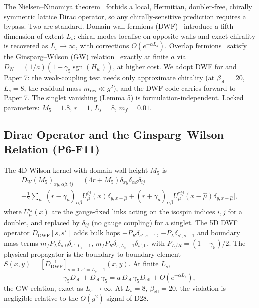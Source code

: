 \documentclass[11pt,a4paper]{article}
\theoremstyle{plain}
\theoremstyle{definition}
\theoremstyle{remark}
\newcommand{\be}{\beta_{\mathrm{eff}}}
\newcommand{\PL}{P_{L}}
\newcommand{\PR}{P_{R}}
\newcommand{\gfive}{\gamma_{5}}
\begin{document}
The Nielsen--Ninomiya theorem~\cite{NN1,NN2} forbids a local, Hermitian,
doubler-free, chirally symmetric lattice Dirac operator, so any
chirally-sensitive prediction requires a bypass. Two are standard. Domain
wall fermions (DWF)~\cite{DWF1,DWF2} introduce a fifth dimension of
extent $L_s$; chiral modes localise on opposite walls and exact chirality
is recovered as $L_s\to\infty$, with corrections $O(e^{-\alpha L_s})$.
Overlap fermions~\cite{NEU} satisfy the Ginsparg--Wilson (GW)
relation~\cite{GW} exactly at finite $a$ via
$D_N=(1/a)(1+\gfive\operatorname{sgn}(H_w))$, at higher cost. We adopt DWF
for  and Paper 7: the weak-coupling test needs only
approximate chirality (at $\be=20$, $L_s=8$, the residual mass
$m_{\mathrm{res}}\ll g^2$), and the DWF code carries forward to Paper 7.
The singlet vanishing (Lemma 5) is formulation-independent. Locked
parameters: $M_5=1.8$, $r=1$, $L_s=8$, $m_f=0.01$.

\subsection{Dirac Operator and the Ginsparg--Wilson Relation (P6-F11)}
\label{ssec:dirac}

The 4D Wilson kernel with domain wall height $M_5$ is
\begin{multline}
  D_W(M_5)_{xy,\alpha\beta,ij}=(4r+M_5)\delta_{xy}\delta_{\alpha\beta}\delta_{ij}\\
  -\tfrac12\sum_\mu\bigl[(r-\gamma_\mu)_{\alpha\beta}U^{ij}_\mu(x)\delta_{y,x+\hat\mu}
  +(r+\gamma_\mu)_{\alpha\beta}U^{\dagger ij}_\mu(x-\hat\mu)\delta_{y,x-\hat\mu}\bigr],
  \label{eq:wilsonkernel}
\end{multline}
where $U^{ij}_\mu(x)$ are the gauge-fixed links acting on the isospin
indices $i,j$ for a doublet, and replaced by $\delta_{ij}$ (no gauge
coupling) for a singlet. The 5D DWF operator
$D_{\mathrm{DWF}}[s,s']$ adds bulk hops $-\PR\delta_{s',s-1}$,
$-\PL\delta_{s',s+1}$ and boundary mass terms
$m_f\PL\delta_{s,0}\delta_{s',L_s-1}$,
$m_f\PR\delta_{s,L_s-1}\delta_{s',0}$, with
$\PL{}_{/R}=(1\mp\gfive)/2$. The physical propagator is the
boundary-to-boundary element
$S(x,y)=[D_{\mathrm{DWF}}^{-1}]_{s=0,s'=L_s-1}(x,y)$. At finite $L_s$,
\begin{equation}
  \gfive D_{\mathrm{eff}}+D_{\mathrm{eff}}\gfive
  =a\,D_{\mathrm{eff}}\gfive D_{\mathrm{eff}}+O(e^{-\alpha L_s}),
  \label{eq:GW}
\end{equation}
the GW relation, exact as $L_s\to\infty$. At $L_s=8$, $\be=20$, the
violation is negligible relative to the $O(g^2)$ signal of D28.
\end{document}
